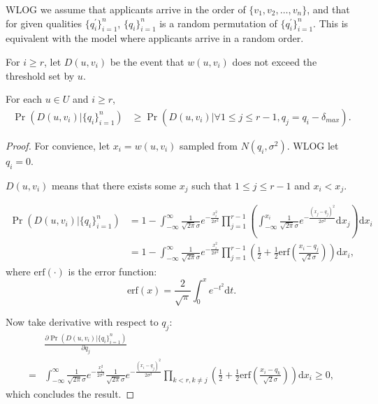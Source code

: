 WLOG we assume that applicants arrive in the order of $\{v_1, v_2, \dots, v_n\}$,
and that for given qualities $\{q_i^\prime\}_{i=1}^n$, $\{q_i\}_{i=1}^n$ is a random permutation of $\{q_i^\prime\}_{i=1}^n$.
This is equivalent with the model where applicants arrive in a random order.

For $i \ge r$, let $D(u, v_i)$ be the event that $w(u, v_i)$
does not exceed the threshold set by $u$.

\begin{proposition} \label{proposition1}
    For each $u \in U$ and $i \ge r$,
    \begin{align*}
    \Pr(D(u, v_i) | \{q_i\}_{i=1}^n) &\ge \Pr(D(u, v_i) | \forall 1 \le j \le r-1, q_j = q_i - \delta_{max}).
    \end{align*}
\end{proposition}

\begin{proof}
    For convience, let $x_i = w(u, v_i)$ sampled from $N(q_i, \sigma^2)$.
    WLOG let $q_i = 0$.

    $D(u, v_i)$ means that there exists some $x_j$ such that $1 \le j \le r-1$ and $x_i < x_j$.

    \begin{align*}
        \Pr(D(u, v_i) | \{q_i\}_{i=1}^n) &= 1 - \int_{-\infty}^{\infty} \frac{1}{\sqrt{2 \pi}\sigma} e^{-\frac{x_i^2}{2\sigma^2}}
    \prod_{j=1}^{r-1}(\int_{-\infty}^{x_i} \frac{1}{\sqrt{2\pi}\sigma} e^{-\frac{(x_j - q_j)^2}{2\sigma^2}}\mathrm{d} x_j) \mathrm{d} x_i \\
    &= 1 - \int_{-\infty}^{\infty} \frac{1}{\sqrt{2 \pi}\sigma} e^{-\frac{x_i^2}{2\sigma^2}}
    \prod_{j=1}^{r-1}(\frac{1}{2} + \frac{1}{2}\mathrm{erf}(\frac{x_i - q_j}{\sqrt{2}\sigma})) \mathrm{d} x_i,
    \end{align*}
    where $\mathrm{erf}(\cdot)$ is the error function:
    \[\mathrm{erf}(x) = \frac{2}{\sqrt{\pi}} \int_{0}^{x} {e^{-t^2}} \mathrm{d} t.\]

    Now take derivative with respect to $q_j$:
    \begin{align*}
        & \frac{\partial\Pr(D(u, v_i) | \{q_i\}_{i=1}^n)}{\partial q_j} \\
        = &\int_{-\infty}^{\infty} \frac{1}{\sqrt{2 \pi}\sigma} e^{-\frac{x_i^2}{2\sigma^2}}
        \frac{1}{\sqrt{2 \pi} \sigma} e^{-\frac{(x_i-q_j)^2}{2\sigma^2}}
        \prod_{k<r,k\neq j}(\frac{1}{2} + \frac{1}{2}\mathrm{erf}(\frac{x_i - q_k}{\sqrt{2}\sigma})) \mathrm{d} x_i
        \ge 0,
    \end{align*}
    which concludes the result.
\end{proof}

